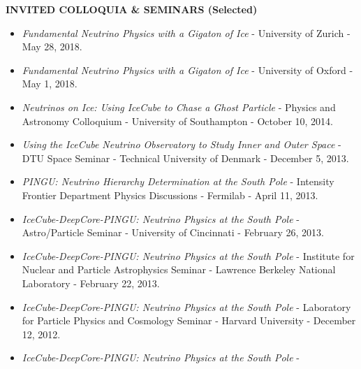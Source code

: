 \documentclass[a4paper,11pt]{article}
\begin{document}
\textbf{INVITED COLLOQUIA \& SEMINARS (Selected)~~\hrulefill}
%
\begin{multicols}{2}
\begin{itemize}[topsep=0pt,itemsep=4.5pt,partopsep=0pt,parsep=0pt]
%
\item{\textit{Fundamental Neutrino Physics with a Gigaton of Ice} - University of Zurich - May 28, 2018.}
%
\item{\textit{Fundamental Neutrino Physics with a Gigaton of Ice}  - University of Oxford - May 1, 2018.}
%
\item{\textit{Neutrinos on Ice: Using IceCube to Chase a Ghost Particle} - 
Physics and Astronomy Colloquium - University of Southampton - October 10, 2014.}
%
\item{\textit{Using the IceCube Neutrino Observatory to Study Inner and Outer Space} - 
DTU Space Seminar - Technical University of Denmark - December 5, 2013.}
%
%
\item{ \textit{PINGU: Neutrino Hierarchy Determination at the South Pole} - 
Intensity Frontier Department Physics Discussions - Fermilab - April 11, 2013.}
%
\item{ \textit{IceCube-DeepCore-PINGU: Neutrino Physics at the South Pole} - 
Astro/Particle Seminar - University of Cincinnati - February 26, 2013.}
%
\item{ \textit{IceCube-DeepCore-PINGU: Neutrino Physics at the South Pole} - 
Institute for Nuclear and Particle Astrophysics Seminar - Lawrence Berkeley National Laboratory  - February 22, 2013.}
%
%
%
\item{\textit{IceCube-DeepCore-PINGU: Neutrino Physics at the South Pole} - 
Laboratory for Particle Physics and Cosmology Seminar - Harvard University - December 12, 2012.}
%
\item{ \textit{IceCube-DeepCore-PINGU: Neutrino Physics at the South Pole} - 
}
\end{itemize}
\end{multicols}
\end{document}
